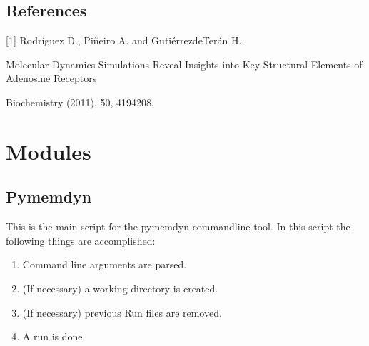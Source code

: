 \documentclass[letterpaper,10pt,english]{sphinxmanual}
\begin{document}
\section{References}
\label{\detokenize{manual:references}}
\begin{DUlineblock}{0em}
\item[] {[}1{]} Rodríguez D., Piñeiro A. and Gutiérrez\sphinxhyphen{}de\sphinxhyphen{}Terán H.
\item[] Molecular Dynamics Simulations Reveal Insights into Key Structural
Elements of Adenosine Receptors
\item[] Biochemistry (2011), 50, 4194\sphinxhyphen{}208.
\end{DUlineblock}

\sphinxstepscope


\chapter{Modules}
\label{\detokenize{modules:modules}}\label{\detokenize{modules::doc}}
\sphinxstepscope


\section{Pymemdyn}
\label{\detokenize{pymemdyn:pymemdyn}}\label{\detokenize{pymemdyn::doc}}
\sphinxAtStartPar
This is the main script for the pymemdyn commandline tool.
In this script the following things are accomplished:
\begin{enumerate}
%
\item {} 
\sphinxAtStartPar
Command line arguments are parsed.

\item {} 
\sphinxAtStartPar
(If necessary) a working directory is created.

\item {} 
\sphinxAtStartPar
(If necessary) previous Run files are removed.

\item {} 
\sphinxAtStartPar
A run is done.

\end{enumerate}
\end{document}
